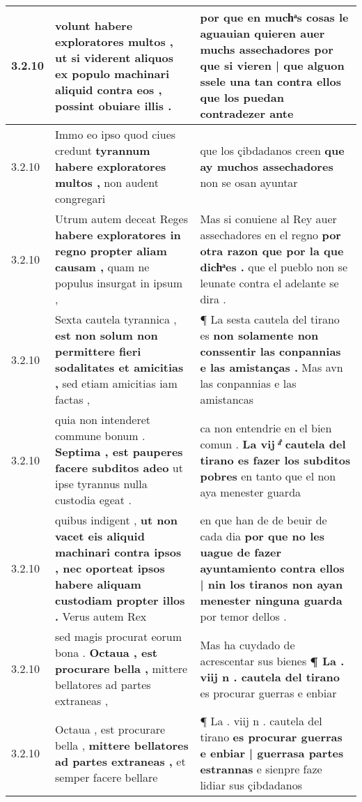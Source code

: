 \begin{tabular}{|p{1cm}|p{6.5cm}|p{6.5cm}|}
3.2.10 & volunt habere exploratores multos , \textbf{ ut si viderent aliquos ex populo machinari aliquid contra eos , } possint obuiare illis . & por que en muchͣs cosas le aguauian quieren auer muchs assechadores \textbf{ por que si vieren | que alguon ssele una tan contra ellos } que los puedan contradezer ante \\\hline
3.2.10 & Immo eo ipso quod ciues credunt \textbf{ tyrannum habere exploratores multos , } non audent congregari & que los çibdadanos creen \textbf{ que ay muchos assechadores } non se osan ayuntar \\\hline
3.2.10 & Utrum autem deceat Reges \textbf{ habere exploratores in regno propter aliam causam , } quam ne populus insurgat in ipsum , & Mas si conuiene al Rey auer assechadores en el regno \textbf{ por otra razon que por la que dichͣes . } que el pueblo non se leunate contra el adelante se dira . \\\hline
3.2.10 & Sexta cautela tyrannica , \textbf{ est non solum non permittere fieri sodalitates et amicitias , } sed etiam amicitias iam factas , & ¶ La sesta cautela del tirano es \textbf{ non solamente non conssentir las conpannias e las amistanças . } Mas avn las conpannias e las amistancas \\\hline
3.2.10 & quia non intenderet commune bonum . \textbf{ Septima , est pauperes facere subditos adeo } ut ipse tyrannus nulla custodia egeat . & ca non entendrie en el bien comun . \textbf{ La vij ͣ̊ cautela del tirano es fazer los subditos pobres } en tanto que el non aya menester guarda \\\hline
3.2.10 & quibus indigent , \textbf{ ut non vacet eis aliquid machinari contra ipsos , nec oporteat ipsos habere aliquam custodiam propter illos . } Verus autem Rex & en que han de de beuir de cada dia \textbf{ por que no les uague de fazer ayuntamiento contra ellos | nin los tiranos non ayan menester ninguna guarda } por temor dellos . \\\hline
3.2.10 & sed magis procurat eorum bona . \textbf{ Octaua , est procurare bella , } mittere bellatores ad partes extraneas , & Mas ha cuydado de acrescentar sus bienes \textbf{ ¶ La . viij n . cautela del tirano } es procurar guerras e enbiar \\\hline
3.2.10 & Octaua , est procurare bella , \textbf{ mittere bellatores ad partes extraneas , } et semper facere bellare & ¶ La . viij n . cautela del tirano \textbf{ es procurar guerras e enbiar | guerrasa partes estrannas } e sienpre faze lidiar sus çibdadanos \\\hline

\end{tabular}
